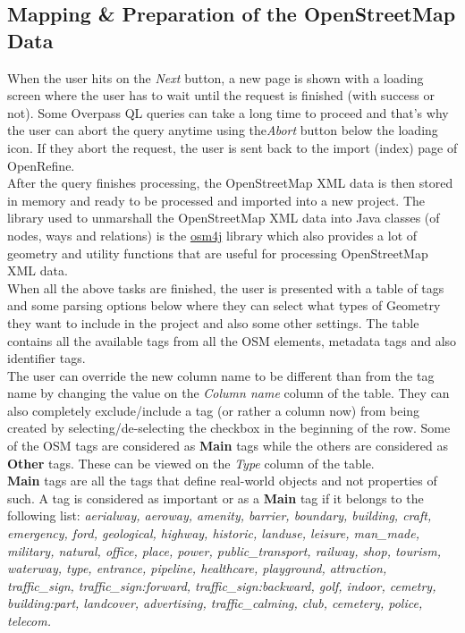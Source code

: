 \subsection{Mapping \& Preparation of the OpenStreetMap Data}\label{sec:mapping-preparation-of-openstreetmap-data}
When the user hits on the \textit{Next} button, a new page is shown with a loading screen where the user has to wait until
the request is finished (with success or not). Some Overpass QL queries can take a long time to proceed and that's why
the user can abort the query anytime using the\textit{Abort} button below the loading icon. If they abort the request,
the user is sent back to the import (index) page of OpenRefine.\\
\newline
After the query finishes processing, the OpenStreetMap XML data is then stored in memory and ready to be processed and imported into a new project.
The library used to unmarshall the OpenStreetMap XML data into Java classes (of nodes, ways and relations) is the \href{https://github.com/topobyte/osm4j}{osm4j} library which also
provides a lot of geometry and utility functions that are useful for processing OpenStreetMap XML data.\\
\newline
When all the above tasks are finished, the user is presented with a table of tags and some parsing options below where they
can select what types of Geometry they want to include in the project and also some other settings. The table contains
all the available tags from all the OSM elements, metadata tags and also identifier tags. \\
\newline
The user can override the new column name to be different than from the tag name by changing the value on the
\textit{Column name} column of the table. They can also completely exclude/include a tag (or rather a column now) from being created
by selecting/de-selecting the checkbox in the beginning of the row. Some of the OSM tags are considered as \textbf{Main}
tags while the others are considered as \textbf{Other} tags. These can be viewed on the \textit{Type} column of the table.\\
\newline
\textbf{Main} tags are all the tags that define real-world objects and not properties of such.
A tag is considered as important or as a \textbf{Main} tag if it belongs to the following list:
\textit{aerialway, aeroway, amenity, barrier, boundary, building, craft, emergency, ford, geological, highway, historic,
landuse, leisure, man\_made, military, natural,
office, place, power, public\_transport, railway, shop, tourism, waterway, type, entrance, pipeline, healthcare,
playground, attraction, traffic\_sign, traffic\_sign:forward, traffic\_sign:backward, golf, indoor, cemetry, building:part,
landcover, advertising, traffic\_calming, club, cemetery, police, telecom.}\\
